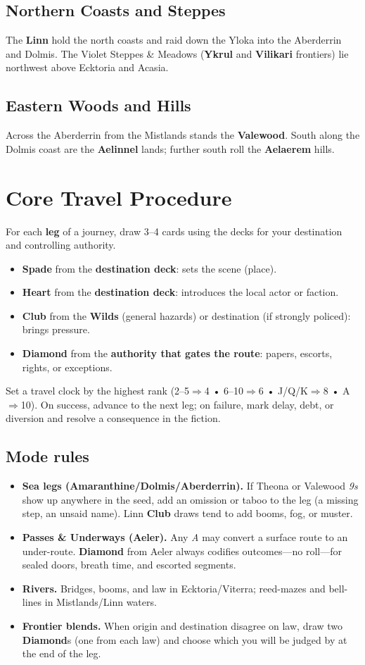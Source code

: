 \documentclass[11pt]{article}
\newcommand{\SuitSpade}{\textbf{Spade}} %
\newcommand{\SuitHeart}{\textbf{Heart}} %
\newcommand{\SuitClub}{\textbf{Club}}   %
\newcommand{\SuitDiamond}{\textbf{Diamond}} %
\newcommand{\ClockSizes}{2--5$\Rightarrow$4 • 6--10$\Rightarrow$6 • J/Q/K$\Rightarrow$8 • A$\Rightarrow$10}
\begin{document}
\subsection*{Northern Coasts and Steppes}
The \textbf{Linn} hold the north coasts and raid down the Yloka into the Aberderrin and Dolmis. The Violet Steppes & Meadows (\textbf{Ykrul} and \textbf{Vilikari} frontiers) lie northwest above Ecktoria and Acasia.

\subsection*{Eastern Woods and Hills}
Across the Aberderrin from the Mistlands stands the \textbf{Valewood}. South along the Dolmis coast are the \textbf{Aelinnel} lands; further south roll the \textbf{Aelaerem} hills.

\section{Core Travel Procedure}
For each \textbf{leg} of a journey, draw 3--4 cards using the decks for your destination and controlling authority.
\begin{itemize}
  \item \SuitSpade{} from the \textbf{destination deck}: sets the scene (place).
  \item \SuitHeart{} from the \textbf{destination deck}: introduces the local actor or faction.
  \item \SuitClub{} from the \textbf{Wilds} (general hazards) or destination (if strongly policed): brings pressure.
  \item \SuitDiamond{} from the \textbf{authority that gates the route}: papers, escorts, rights, or exceptions.
\end{itemize}
Set a travel clock by the highest rank (\ClockSizes). On success, advance to the next leg; on failure, mark delay, debt, or diversion and resolve a consequence in the fiction.

\subsection*{Mode rules}
\begin{itemize}
  \item \textbf{Sea legs (Amaranthine/Dolmis/Aberderrin).} If Theona or Valewood \emph{9s} show up anywhere in the seed, add an omission or taboo to the leg (a missing step, an unsaid name). Linn \SuitClub{} draws tend to add booms, fog, or muster.
  \item \textbf{Passes & Underways (Aeler).} Any \emph{A} may convert a surface route to an under-route. \SuitDiamond{} from Aeler always codifies outcomes---no roll---for sealed doors, breath time, and escorted segments.
  \item \textbf{Rivers.} Bridges, booms, and law in Ecktoria/Viterra; reed-mazes and bell-lines in Mistlands/Linn waters.
  \item \textbf{Frontier blends.} When origin and destination disagree on law, draw two \SuitDiamond{}s (one from each law) and choose which you will be judged by at the end of the leg.
\end{itemize}
\end{document}
